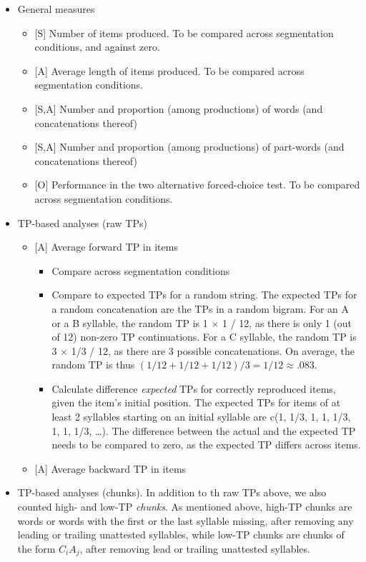 \documentclass[]{article}
\providecommand{\tightlist}{%
  \setlength{\itemsep}{0pt}\setlength{\parskip}{0pt}}
\begin{document}
\begin{itemize}
\tightlist
\item
  General measures

  \begin{itemize}
  \tightlist
  \item
    {[}S{]} Number of items produced. To be compared across segmentation
    conditions, and against zero.
  \item
    {[}A{]} Average length of items produced. To be compared across
    segmentation conditions.
  \item
    {[}S,A{]} Number and proportion (among productions) of words (and
    concatenations thereof)
  \item
    {[}S,A{]} Number and proportion (among productions) of part-words
    (and concatenations thereof)
  \item
    {[}O{]} Performance in the two alternative forced-choice test. To be
    compared across segmentation conditions.
  \end{itemize}
\item
  TP-based analyses (raw TPs)

  \begin{itemize}
  \tightlist
  \item
    {[}A{]} Average forward TP in items

    \begin{itemize}
    \tightlist
    \item
      Compare across segmentation conditions
    \item
      Compare to expected TPs for a random string. The expected TPs for
      a random concatenation are the TPs in a random bigram. For an A or
      a B syllable, the random TP is 1 \(\times\) 1 / 12, as there is
      only 1 (out of 12) non-zero TP continuations. For a C syllable,
      the random TP is 3 \(\times\) 1/3 / 12, as there are 3 possible
      concatenations. On average, the random TP is thus
      \((1/12 + 1/12 + 1/12)/ 3 = 1/12 \approx .083\).
    \item
      Calculate difference \emph{expected} TPs for correctly reproduced
      items, given the item's initial position. The expected TPs for
      items of at least 2 syllables starting on an initial syllable are
      c(1, 1/3, 1, 1, 1/3, 1, 1, 1/3, \ldots{}). The difference between
      the actual and the expected TP needs to be compared to zero, as
      the expected TP differs across items.
    \end{itemize}
  \item
    {[}A{]} Average backward TP in items
  \end{itemize}
\item
  TP-based analyses (chunks). In addition to th raw TPs above, we also
  counted high- and low-TP \emph{chunks}. As mentioned above, high-TP
  chunks are words or words with the first or the last syllable missing,
  after removing any leading or trailing unattested syllables, while
  low-TP chunks are chunks of the form \(C_iA_j\), after removing lead
  or trailing unattested syllables.


\end{itemize}
\end{document}

